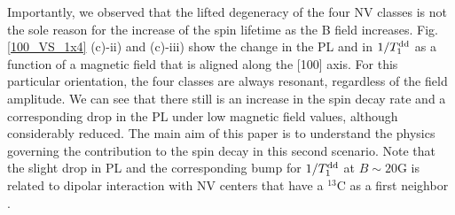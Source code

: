 \documentclass[preprintnumbers,amsmath,amssymb,superscriptaddress,twocolumn,showpacs]{revtex4-2}
\begin{document}
Importantly, we observed that the lifted degeneracy of the four NV classes is not the sole reason for the increase of the spin lifetime as the B field increases. Fig. \ref{100_VS_1x4} (c)-ii) and (c)-iii) show the change in the PL and in $1/T_1^{\rm dd}$ as a function of a magnetic field that is aligned along the [100] axis. For this particular orientation, the four classes are always resonant, regardless of the field amplitude. We can see that there still is an increase in the spin decay rate and a corresponding drop in the PL under low magnetic field values, although considerably reduced. 
The main aim of this paper is to understand the physics governing the contribution to the spin decay in this second scenario. Note that the slight drop in PL and the corresponding bump for $1/T_1^{\rm dd}$ at $B \sim 20$G is related to dipolar interaction with NV centers that have a $^{13}$C as a first neighbor \cite{pellet2021optical}. 
\end{document}
